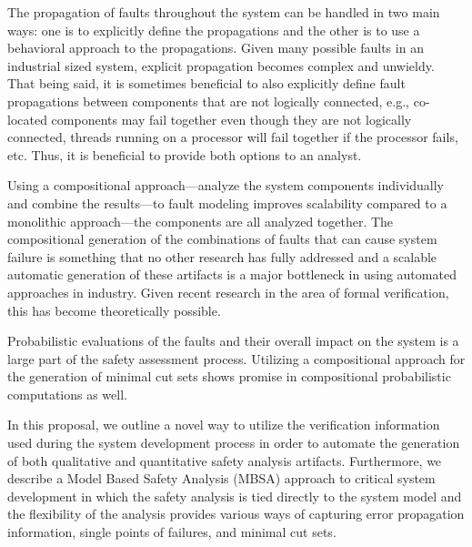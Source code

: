 The propagation of faults throughout the system can be handled in two main ways: one is to explicitly define the propagations and the other is to use a behavioral approach to the propagations. Given many possible faults in an industrial sized system, explicit propagation becomes complex and unwieldy. That being said, it is sometimes beneficial to also explicitly define fault propagations between components that are not logically connected, e.g., co-located components may fail together even though they are not logically connected, threads running on a processor will fail together if the processor fails, etc. Thus, it is beneficial to provide both options to an analyst. 

Using a compositional approach---analyze the system components individually and combine the results---to fault modeling improves scalability compared to a monolithic approach---the components are all analyzed together. The compositional generation of the combinations of faults that can cause system failure is something that no other research has fully addressed and a scalable automatic generation of these artifacts is a major bottleneck in using automated approaches in industry. Given recent research in the area of formal verification, this has become theoretically possible.

Probabilistic evaluations of the faults and their overall impact on the system is a large part of the safety assessment process. Utilizing a compositional approach for the generation of minimal cut sets shows promise in compositional probabilistic computations as well. %

In this proposal, we outline a novel way to utilize the verification information used during the system development process in order to automate the generation of both qualitative and quantitative safety analysis artifacts. Furthermore, we describe a Model Based Safety Analysis (MBSA) approach to critical system development in which the safety analysis is tied directly to the system model and the flexibility of the analysis provides various ways of capturing error propagation information, single points of failures, and minimal cut sets.

